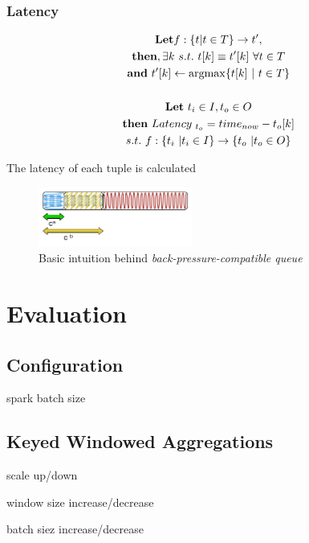 \documentclass{vldb}
\begin{document}
\subsubsection{Latency}
\label{sec_latency}

\begin{equation}
  \begin{gathered}
\textbf{Let} f:\{t| t\in T \} \to t'  , \\
  \textbf{then}, \exists k \ s.t. \ t[k]  \equiv t'[k] \ \forall t \in T\\
  \textbf{and} \ t'[k] \gets \argmax\{t[k] \ | \ t \in T\}  \\
   \\
  \textbf{Let} \ t_{i} \in I , t_{o} \in O \\
\textbf{then} \ Latency_{ \ t_{o}} = time_{now} -  t_{o}[k] \\
s.t. \ f:\{t_{i} \ | t_{i} \in I \} \to \{t_{o} \ | t_{o} \in O \} 
  \end{gathered}\label{eq_1} 
\end{equation}

The latency of each tuple is calculated


\begin{figure}[h]
\centering
\includegraphics[width=0.45\textwidth]{queue}
\caption{Basic intuition behind \textit{back-pressure-compatible queue}}
\label{fig_queue}
\end{figure}


\section{Evaluation}
\subsection{Configuration}
spark batch size

\subsection{Keyed Windowed Aggregations}
scale up/down

window size increase/decrease

batch siez increase/decrease
\end{document}

